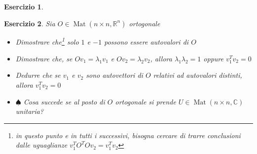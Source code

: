 \documentclass{article}
\newtheorem{es}{Esercizio}
\begin{document}
{\begin{es}
\end{es}



\begin{es}
    Sia $O\in\operatorname{Mat}(n\times n, \mathbb{R}^n)$ ortogonale 
    \begin{itemize}
        \item Dimostrare che\footnote{in questo punto e in tutti i successivi, bisogna cercare di trarre conclusioni dalle uguaglianze $v_1^T O^T O v_2=v_1^T v_2$} solo $1$ e $-1$ possono essere autovalori di $O$
        \item Dimostrare che, se $O v_1=\lambda_1 v_1$ e $O v_2=\lambda_2 v_2$, allora $\lambda_1\lambda_2=1$ oppure $v_1^T v_2=0$
        \item Dedurre che se $v_1$ e $v_2$ sono autovettori di $O$ relativi ad autovalori distinti, allora $v_1^T v_2=0$
        \item $\spadesuit$ Cosa succede se al posto di $O$ ortogonale si prende $U\in\operatorname{Mat}(n\times n,\mathbb{C})$ unitaria?
    \end{itemize}
\end{es}








}
\end{document}

